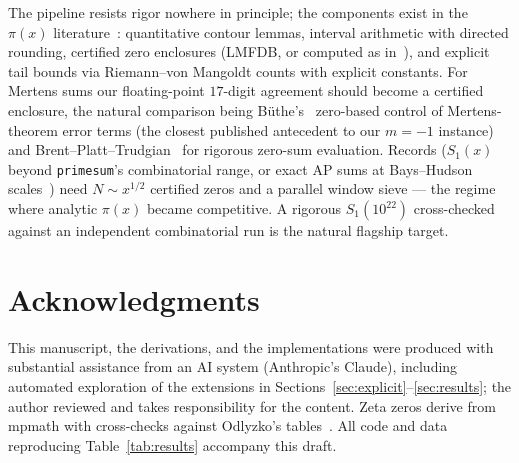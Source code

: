 \documentclass[11pt]{article}
\begin{document}
The pipeline resists rigor nowhere in principle; the components exist in
the $\pi(x)$ literature~\cite{Platt15,FKBJ17,Buthe14}: quantitative
contour lemmas, interval arithmetic with directed rounding, certified zero
enclosures (LMFDB, or computed as in~\cite{Platt15}), and explicit tail
bounds via Riemann--von Mangoldt counts with explicit constants. For
Mertens sums our floating-point $17$-digit agreement should become a
certified enclosure, the natural comparison being
B\"uthe's~\cite{Buthe15} zero-based control of Mertens-theorem error terms
(the closest published antecedent to our $m=-1$ instance) and
Brent--Platt--Trudgian~\cite{BPT20} for rigorous zero-sum evaluation.
Records ($S_1(x)$ beyond \texttt{primesum}'s combinatorial range, or exact
AP sums at Bays--Hudson scales~\cite{BH00}) need $N\sim x^{1/2}$ certified
zeros and a parallel window sieve --- the regime where analytic $\pi(x)$
became competitive. A rigorous $S_1(10^{22})$ cross-checked against an
independent combinatorial run is the natural flagship target.

\section*{Acknowledgments}
This manuscript, the derivations, and the implementations were produced
with substantial assistance from an AI system (Anthropic's Claude),
including automated exploration of the extensions in
Sections~\ref{sec:explicit}--\ref{sec:results}; the author reviewed and
takes responsibility for the content. Zeta zeros derive from mpmath with
cross-checks against Odlyzko's tables~\cite{Odlyzko}. All code and data
reproducing Table~\ref{tab:results} accompany this draft.
\end{document}
